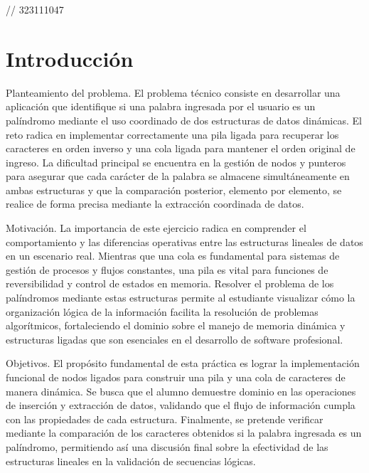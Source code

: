 // 323111047

\section{Introducción}

Planteamiento del problema. El problema técnico consiste en desarrollar una aplicación que identifique si una palabra ingresada por el usuario es un palíndromo mediante el uso coordinado de dos estructuras de datos dinámicas. El reto radica en implementar correctamente una pila ligada para recuperar los caracteres en orden inverso y una cola ligada para mantener el orden original de ingreso. La dificultad principal se encuentra en la gestión de nodos y punteros para asegurar que cada carácter de la palabra se almacene simultáneamente en ambas estructuras y que la comparación posterior, elemento por elemento, se realice de forma precisa mediante la extracción coordinada de datos.

\vspace{0.4cm}

Motivación. La importancia de este ejercicio radica en comprender el comportamiento y las diferencias operativas entre las estructuras lineales de datos en un escenario real. Mientras que una cola es fundamental para sistemas de gestión de procesos y flujos constantes, una pila es vital para funciones de reversibilidad y control de estados en memoria. Resolver el problema de los palíndromos mediante estas estructuras permite al estudiante visualizar cómo la organización lógica de la información facilita la resolución de problemas algorítmicos, fortaleciendo el dominio sobre el manejo de memoria dinámica y estructuras ligadas que son esenciales en el desarrollo de software profesional.

\vspace{0.4cm}

Objetivos. El propósito fundamental de esta práctica es lograr la implementación funcional de nodos ligados para construir una pila y una cola de caracteres de manera dinámica. Se busca que el alumno demuestre dominio en las operaciones de inserción y extracción de datos, validando que el flujo de información cumpla con las propiedades de cada estructura. Finalmente, se pretende verificar mediante la comparación de los caracteres obtenidos si la palabra ingresada es un palíndromo, permitiendo así una discusión final sobre la efectividad de las estructuras lineales en la validación de secuencias lógicas.